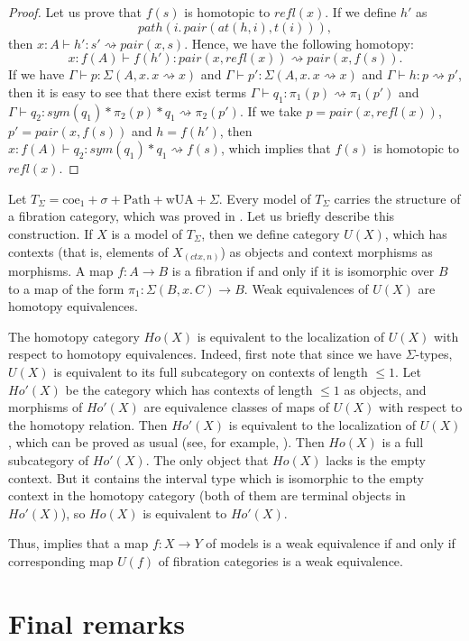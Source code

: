 \documentclass{mscs}
\newcommand{\idtype}{\rightsquigarrow}
\newcommand{\wUA}{\mathrm{wUA}}
\newcommand{\coe}{\mathrm{coe}}
\newcommand{\Path}{\mathrm{Path}}
\numberwithin{figure}{section}
\begin{document}
\begin{proof}
Let us prove that $f(s)$ is homotopic to $refl(x)$.
If we define $h'$ as
\[ path(i.\,pair(at(h,i), t(i))), \]
then $x : A \vdash h' : s' \idtype pair(x,s)$.
Hence, we have the following homotopy:
\[ x : f(A) \vdash f(h') : pair(x, refl(x)) \idtype pair(x, f(s)). \]
If we have $\Gamma \vdash p : \Sigma(A, x.\,x \idtype x)$ and $\Gamma \vdash p' : \Sigma(A, x.\,x \idtype x)$ and $\Gamma \vdash h : p \idtype p'$,
then it is easy to see that there exist terms $\Gamma \vdash q_1 : \pi_1(p) \idtype \pi_1(p')$ and $\Gamma \vdash q_2 : sym(q_1) * \pi_2(p) * q_1 \idtype \pi_2(p')$.
If we take $p = pair(x, refl(x))$, $p' = pair(x, f(s))$ and $h = f(h')$, then $x : f(A) \vdash q_2 : sym(q_1) * q_1 \idtype f(s)$,
which implies that $f(s)$ is homotopic to $refl(x)$.
\end{proof}

Let $T_\Sigma = \coe_1 + \sigma + \Path + \wUA + \Sigma$.
Every model of $T_\Sigma$ carries the structure of a fibration category, which was proved in \cite{tt-fibr-cat}.
Let us briefly describe this construction.
If $X$ is a model of $T_\Sigma$, then we define category $U(X)$, which has contexts (that is, elements of $X_{(ctx,n)}$) as objects and context morphisms as morphisms.
A map $f : A \to B$ is a fibration if and only if it is isomorphic over $B$ to a map of the form $\pi_1 : \Sigma(B, x.\,C) \to B$.
Weak equivalences of $U(X)$ are homotopy equivalences.

The homotopy category $Ho(X)$ is equivalent to the localization of $U(X)$ with respect to homotopy equivalences.
Indeed, first note that since we have $\Sigma$-types, $U(X)$ is equivalent to its full subcategory on contexts of length $\leq 1$.
Let $Ho'(X)$ be the category which has contexts of length $\leq 1$ as objects,
and morphisms of $Ho'(X)$ are equivalence classes of maps of $U(X)$ with respect to the homotopy relation.
Then $Ho'(X)$ is equivalent to the localization of $U(X)$, which can be proved as usual (see, for example, \cite[Corollary~1.2.9]{hovey}).
Then $Ho(X)$ is a full subcategory of $Ho'(X)$.
The only object that $Ho(X)$ lacks is the empty context.
But it contains the interval type which is isomorphic to the empty context in the homotopy category
(both of them are terminal objects in $Ho'(X)$), so $Ho(X)$ is equivalent to $Ho'(X)$.

Thus,  implies that a map $f : X \to Y$ of models is a weak equivalence if and only if
corresponding map $U(f)$ of fibration categories is a weak equivalence.

\section{Final remarks}
\end{document}
